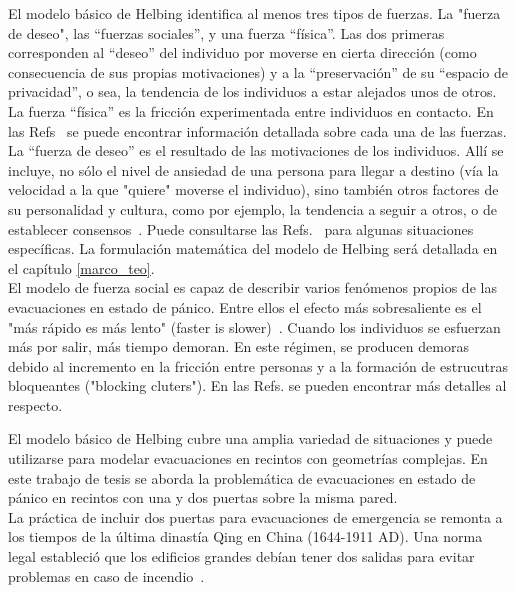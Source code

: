 \noindent El modelo básico de Helbing identifica al menos tres tipos de fuerzas. La "fuerza de deseo", las “fuerzas sociales”,  y una fuerza “física”.  Las dos primeras corresponden al “deseo” del individuo por moverse en cierta dirección (como consecuencia de sus propias motivaciones) y a la “preservación” de su “espacio de privacidad”, o sea, la tendencia de los individuos a estar alejados unos de otros. La fuerza “física” es la  fricción experimentada entre individuos en contacto. En las Refs~\cite{Helbing1,Dorso1,Dorso3} se puede encontrar información detallada sobre cada una de las fuerzas.\\ 

\noindent La “fuerza de deseo” es el resultado de las motivaciones de los individuos. Allí se incluye, no sólo el nivel de ansiedad de una persona para llegar a destino (vía la velocidad a la que "quiere" moverse el individuo), sino también otros factores de su personalidad y cultura, como por ejemplo, la tendencia a seguir a otros, o de establecer consensos~\cite{Dorso3,Dorso4}.  Puede consultarse las Refs.~\cite{Wang,low} para algunas situaciones específicas. 
La formulación matemática del modelo de Helbing será detallada en el capítulo \ref{marco_teo}. \\ 

El modelo de fuerza social es capaz de describir varios fenómenos propios de las evacuaciones en estado de pánico. Entre ellos el efecto más sobresaliente es el "más rápido es más lento" (faster is slower)~\cite{Helbing1}. Cuando los individuos se esfuerzan más por salir, más tiempo demoran. En este régimen, se producen demoras debido al incremento en la fricción entre personas y a la formación de estrucutras bloqueantes ("blocking cluters"). En las Refs. \cite{Dorso1} se pueden encontrar más detalles al respecto.

\noindent El modelo básico de Helbing cubre una amplia variedad de situaciones y puede utilizarse para modelar evacuaciones en recintos con geometrías complejas. En este trabajo de tesis se aborda la problemática de evacuaciones en estado de pánico en recintos con una y dos puertas sobre la misma pared.\\ 

\noindent La práctica de incluir dos puertas para evacuaciones de emergencia se remonta a los tiempos de la última dinastía Qing en China (1644-1911 AD). Una norma legal estableció que los edificios grandes debían tener dos salidas para evitar problemas en caso de incendio~\cite{cheng}.\\

